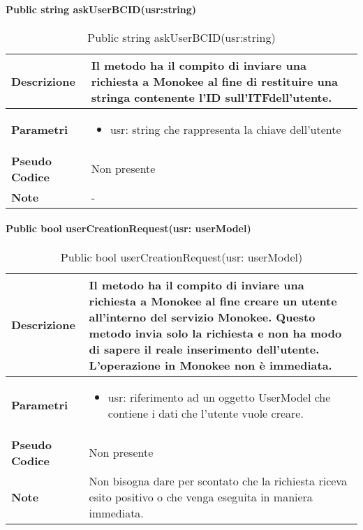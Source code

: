 \paragraph{Public string askUserBCID(usr:string)}
\begin{center}
    \begin{longtable}{|p{3cm}|p{9cm}|}%
    \caption{Public string askUserBCID(usr:string)}
    \label{tab:public-string-askUserBCID}
    \endfirsthead
    \endhead
    \hline
    \textbf{Descrizione} & Il metodo ha il compito di inviare una richiesta a Monokee al fine di restituire una stringa contenente l’ID sull’ITFdell’utente.\\
    \hline
    \textbf{Parametri} &      
        \begin{itemize}
            \item usr: string che rappresenta la chiave dell’utente
        \end{itemize}
    \\
    \hline
    \textbf{Pseudo Codice} & Non presente \\
    \hline
    \textbf{Note} & - \\
    \hline
    \end{longtable}
    \end{center}



\paragraph{Public bool userCreationRequest(usr: userModel)}
\begin{center}
    \begin{longtable}{|p{3cm}|p{9cm}|}%
    \caption{Public bool userCreationRequest(usr: userModel)}
    \label{tab:public-bool-userCreationRequest}
    \endfirsthead
    \endhead
    \hline
    \textbf{Descrizione} & Il metodo ha il compito di inviare una richiesta a Monokee al fine creare un utente all’interno del servizio Monokee. Questo metodo invia solo la richiesta e non ha modo di sapere il reale inserimento dell’utente. L’operazione in Monokee non è immediata.\\
    \hline
    \textbf{Parametri} &      
        \begin{itemize}
            \item usr: riferimento ad un oggetto UserModel che contiene i dati che l'utente vuole creare.
        \end{itemize}
    \\
    \hline
    \textbf{Pseudo Codice} & Non presente \\
    \hline
    \textbf{Note} & Non bisogna dare per scontato che la richiesta riceva esito positivo o che venga eseguita in maniera immediata. \\
    \hline
    \end{longtable}
    \end{center}



